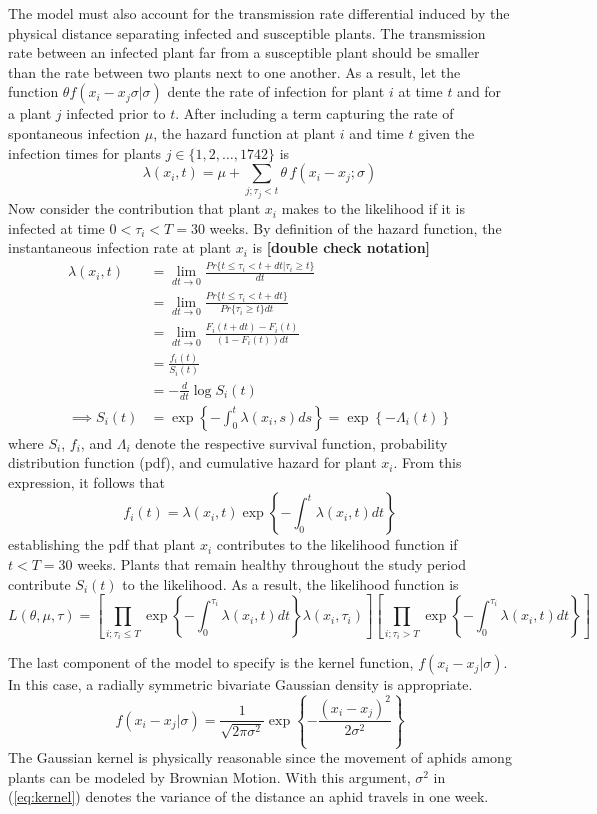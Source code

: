 \documentclass{uwstat572}
\begin{document}
The model must also account for the transmission rate differential induced by the physical distance separating infected and susceptible plants. 
The transmission rate between an infected plant far from a susceptible plant should be smaller than the rate between two plants next to one another.
As a result, let the function $\theta f(x_i -x_j \sigma | \sigma)$ dente the rate of infection for plant $i$ at time $t$ and for a plant $j$ infected prior to $t$. 
After including a term capturing the rate of spontaneous infection $\mu$, the hazard function at plant $i$ and time $t$ given the infection times for plants $j \in \{1, 2, \dots, 1742\}$ is 
$$\lambda(x_i,t) = \mu + \sum_{j; \tau_j<t} \theta \, f(x_i - x_j; \sigma)$$
Now consider the contribution that plant $x_i$ makes to the likelihood if it is infected at time $0<\tau_i<T=30$ weeks. 
By definition of the hazard function, the instantaneous infection rate at plant $x_i$ is \textbf{[double check notation]}
\begin{align*}
\lambda(x_i, t) &= \lim_{dt \to 0} \frac{Pr\{ t \le \tau_i < t+dt | \tau_i \ge t \}}{dt} \\
	&= \lim_{dt \to 0} \frac{Pr\{ t \le \tau_i < t+dt\}}{Pr\{\tau_i\ge t\}dt}\\
	&= \lim_{dt \to 0} \frac{F_i(t+dt) - F_i(t)}{(1-F_i(t))dt} \\
	&= \frac{f_i(t)}{S_i(t)}\\
	&= -\frac{d}{dt} \log S_i(t) \\
\implies S_i(t) &= \exp \left\{ - \int_0^t \lambda(x_i,s) ds  \right\} = \exp \left\{ - \Lambda_i(t)  \right\}
\end{align*}
where $S_i$, $f_i$, and $\Lambda_i$ denote the respective survival function, probability distribution function (pdf), and cumulative hazard for plant $x_i$. 
From this expression, it follows that
$$ f_i(t) = \lambda(x_i,t) \exp \left\{ - \int_0^t \lambda(x_i,t) dt  \right\}$$
establishing the pdf that plant $x_i$ contributes to the likelihood function if $t<T=30$ weeks. 
Plants that remain healthy throughout the study period contribute $S_i(t)$ to the likelihood. 
As a result, the likelihood function is
\begin{equation} 
L(\theta, \mu, \tau) = \left[ \prod_{i;\tau_i \le T} \exp \left\{-\int^{\tau_i}_0 \lambda(x_i, t)dt\right \} \lambda(x_i, \tau_i)\right] \left[ \prod_{i;\tau_i > T} \exp \left\{-\int^{\tau_i}_0 \lambda(x_i, t)dt \right\}\right] 
\end{equation}

The last component of the model to specify is the kernel function, $f(x_i -x_j | \sigma)$. 
In this case, a radially symmetric bivariate Gaussian density is appropriate. 
\begin{equation} f( x_i-x_j |\sigma) = \frac{1}{\sqrt{2\pi \sigma^2}} \exp \left\{-\frac{(x_i-x_j )^2}{2\sigma^2} \right\} \label{eq:kernel} \end{equation}
The Gaussian kernel is physically reasonable since the movement of aphids among plants can be modeled by Brownian Motion. 
With this argument, $\sigma^2$ in (\ref{eq:kernel}) denotes the variance of the distance an aphid travels in one week. 
\end{document}
